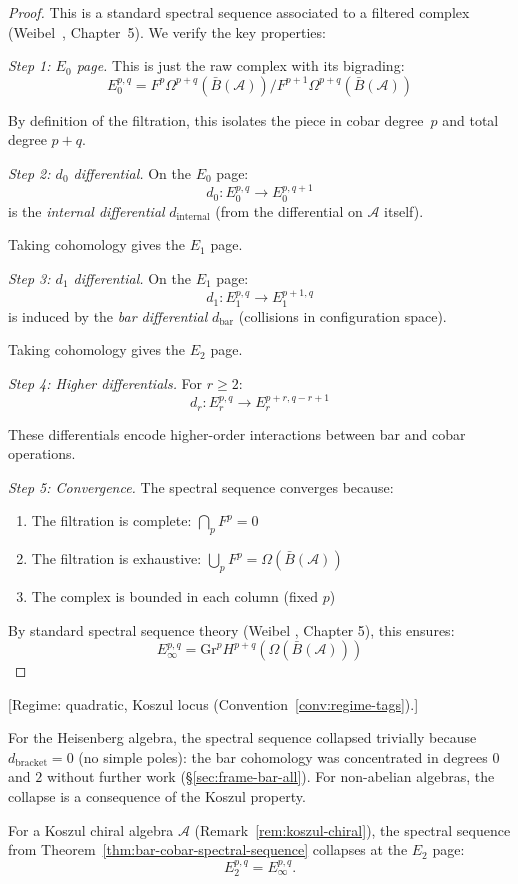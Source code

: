 \begin{proof}
This is a standard spectral sequence associated to a filtered complex (Weibel~\cite{Weibel94}, Chapter~5).  We verify the key properties:

\emph{Step 1: $E_0$ page.} This is just the raw complex with its bigrading:
\[E_0^{p,q} = F^p\Omega^{p+q}(\bar{B}(\mathcal{A})) / F^{p+1}\Omega^{p+q}(\bar{B}(\mathcal{A}))\]

By definition of the filtration, this isolates the piece in cobar degree~$p$ and total degree $p+q$.

\emph{Step 2: $d_0$ differential.} On the $E_0$ page:
\[d_0: E_0^{p,q} \to E_0^{p,q+1}\]
is the \emph{internal differential} $d_{\text{internal}}$ (from the differential 
on $\mathcal{A}$ itself).

Taking cohomology gives the $E_1$ page.

\emph{Step 3: $d_1$ differential.} On the $E_1$ page:
\[d_1: E_1^{p,q} \to E_1^{p+1,q}\]
is induced by the \emph{bar differential} $d_{\text{bar}}$ (collisions in 
configuration space).

Taking cohomology gives the $E_2$ page.

\emph{Step 4: Higher differentials.} For $r \geq 2$:
\[d_r: E_r^{p,q} \to E_r^{p+r,q-r+1}\]

These differentials encode higher-order interactions between bar and cobar operations.

\emph{Step 5: Convergence.} The spectral sequence converges because:
\begin{enumerate}
\item The filtration is complete: $\bigcap_p F^p = 0$
\item The filtration is exhaustive: $\bigcup_p F^p = \Omega(\bar{B}(\mathcal{A}))$
\item The complex is bounded in each column (fixed $p$)
\end{enumerate}

By standard spectral sequence theory (Weibel \cite{Weibel94}, Chapter 5), this ensures:
\[E_\infty^{p,q} = \text{Gr}^p H^{p+q}(\Omega(\bar{B}(\mathcal{A})))\]
\end{proof}

\begin{theorem}\label{thm:spectral-sequence-collapse}
\textup{[Regime: quadratic, Koszul locus
\textup{(}Convention~\textup{\ref{conv:regime-tags})}.]}

For the Heisenberg algebra, the spectral sequence collapsed trivially because $d_{\mathrm{bracket}} = 0$ (no simple poles): the bar cohomology was concentrated in degrees $0$ and $2$ without further work (\S\ref{sec:frame-bar-all}).  For non-abelian algebras, the collapse is a consequence of the Koszul property.

For a Koszul chiral algebra $\mathcal{A}$ (Remark~\ref{rem:koszul-chiral}), the spectral sequence from
Theorem~\ref{thm:bar-cobar-spectral-sequence} collapses at the $E_2$ page:
\[E_2^{p,q} = E_\infty^{p,q}.\]
\end{theorem}

